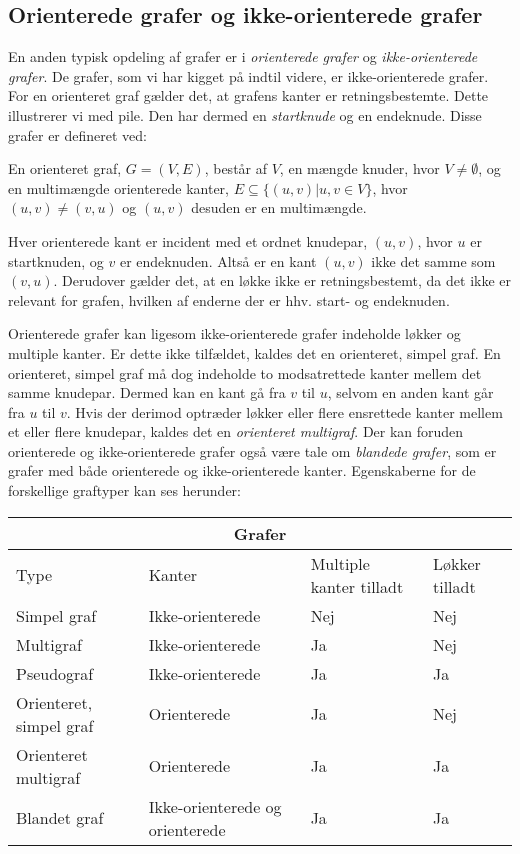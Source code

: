 \subsection{Orienterede grafer og ikke-orienterede grafer}
En anden typisk opdeling af grafer er i \emph{orienterede grafer} og \emph{ikke-orienterede grafer}. De grafer, som vi har kigget på indtil videre, er ikke-orienterede grafer. For en orienteret graf gælder det, at grafens kanter er retningsbestemte. Dette illustrerer vi med pile. Den har dermed en \emph{startknude} og en endeknude. Disse grafer er defineret ved:

\begin{defn}  
En orienteret graf, $G=(V,E)$, består af $V$, en mængde knuder, hvor $V \neq \emptyset$, og en multimængde orienterede kanter, $E \subseteq \{(u,v)|u,v \in V\}$, hvor $(u,v) \neq (v,u)$ og $(u,v)$ desuden er en multimængde. 
\end{defn}

Hver orienterede kant er incident med et ordnet knudepar, $(u,v)$, hvor $u$ er startknuden, og $v$ er endeknuden. Altså er en kant $(u,v)$ ikke det samme som $(v,u)$.
Derudover gælder det, at en løkke ikke er retningsbestemt, da det ikke er relevant for grafen, hvilken af enderne der er hhv. start- og endeknuden.



Orienterede grafer kan ligesom ikke-orienterede grafer indeholde løkker og multiple kanter. Er dette ikke tilfældet, kaldes det en orienteret, simpel graf. En orienteret, simpel graf må dog indeholde to modsatrettede kanter mellem det samme knudepar. Dermed kan en kant gå fra $v$ til $u$, selvom en anden kant går fra $u$ til $v$. Hvis der derimod optræder løkker eller flere ensrettede kanter mellem et eller flere knudepar, kaldes det en \emph{orienteret multigraf}. 
Der kan foruden orienterede og ikke-orienterede grafer også være tale om \emph{blandede grafer}, som er grafer med både orienterede og ikke-orienterede kanter.  
Egenskaberne for de forskellige graftyper kan ses herunder:


\begin{center} \label{tab:typer}
\begin{tabular}{ |p{4cm}|p{3cm}|p{3cm}|p{2cm}|  }
 \hline
 \multicolumn{4}{|c|}{Grafer} \\
 \hline
 Type & Kanter & Multiple kanter tilladt & Løkker tilladt\\
 \hline
 Simpel graf   & Ikke-orienterede    & Nej &   Nej\\
 Multigraf &   Ikke-orienterede & Ja   & Nej\\
 Pseudograf & Ikke-orienterede & Ja &  Ja\\
 Orienteret, simpel graf    & Orienterede & Ja \footnotemark &  Nej\\
 Orienteret multigraf &  Orienterede  & Ja & Ja\\
 Blandet graf & Ikke-orienterede og orienterede  & Ja   & Ja\\
 \hline
\end{tabular}
\end{center}


